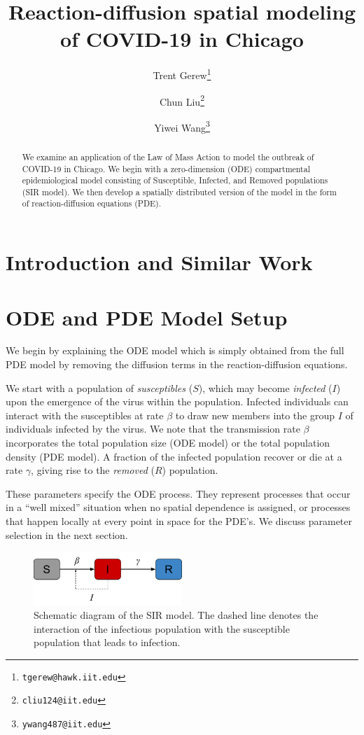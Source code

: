 \documentclass[11pt]{article}
\title{Reaction-diffusion spatial modeling of COVID-19 in Chicago}
\author{Trent Gerew\thanks{\texttt{tgerew@hawk.iit.edu}} \and 
	Chun Liu\thanks{\texttt{cliu124@iit.edu}} \and 
	Yiwei Wang\thanks{\texttt{ywang487@iit.edu}}}
\institute{Department of Applied Mathematics, Illinois Institute of Technology, Chicago, Illinois}
\begin{document}
\maketitle

\begin{abstract}
	We examine an application of the Law of Mass Action to model the outbreak of COVID-19 in Chicago.
	We begin with a zero-dimension (ODE) compartmental epidemiological model consisting of Susceptible, Infected, and Removed populations (SIR model).
	We then develop a spatially distributed version of the model in the form of reaction-diffusion equations (PDE).
\end{abstract}

\section{Introduction and Similar Work}

\section{ODE and PDE Model Setup}
We begin by explaining the ODE model which is simply obtained from the full PDE model by removing the diffusion terms in the reaction-diffusion equations.

We start with a population of \textit{susceptibles} ($S$), which may become \textit{infected} ($I$) upon the emergence of the virus within the population.
Infected individuals can interact with the susceptibles at rate $\beta$ to draw new members into the group $I$ of individuals infected by the virus.
We note that the transmission rate $\beta$ incorporates the total population size (ODE model) or the total population density (PDE model).
A fraction of the infected population recover or die at a rate $\gamma$, giving rise to the \textit{removed} ($R$) population.

These parameters specify the ODE process.
They represent processes that occur in a ``well mixed'' situation when no spatial dependence is assigned,
or processes that happen locally at every point in space for the PDE's.
We discuss parameter selection in the next section.

\begin{figure}[h]
	\centering
	\includegraphics[width=0.5\textwidth]{sir_schematic}
	\caption{Schematic diagram of the SIR model. The dashed line denotes the interaction of the infectious population with the susceptible population that leads to infection.}
	\label{fig:schematic}
\end{figure}
\end{document}
